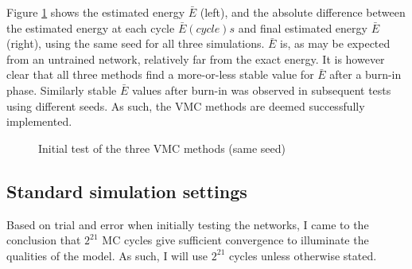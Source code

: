 \documentclass[%
oneside,                 %
final,                   %
10pt]{article}
\begin{document}
Figure \ref{fig:inital_1} shows the estimated energy $\bar E$ (left), and the absolute difference between the estimated energy at each cycle $\bar E(cycle)s$ and final estimated energy $\bar E$ (right), using the same seed for all three simulations. $\bar E$ is, as may be expected from an untrained network, relatively far from the exact energy. It is however clear that all three methods find a more-or-less stable value for $\bar E$ after a burn-in phase.  Similarly stable $\bar E$ values after burn-in was observed in subsequent tests using different seeds. As such, the VMC methods are deemed successfully implemented.
	\begin{figure}
		\centering
		\caption{Initial test of the three VMC methods (same seed)}
		   \label{fig:inital_1}   
	\end{figure}


\subsection{Standard simulation settings}
Based on trial and error when initially testing the networks, I came to the conclusion that $2^{21}$ MC cycles give sufficient convergence to illuminate the qualities of the model. As such, I will use $2^{21}$ cycles unless otherwise stated.
\end{document}
